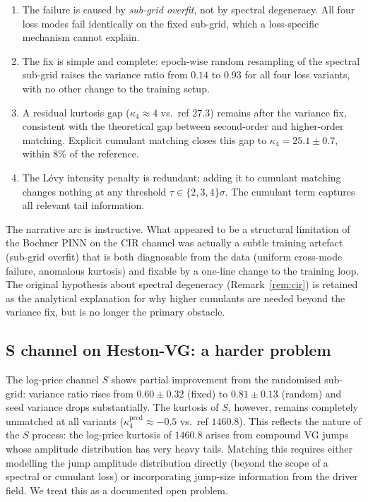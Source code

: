 \documentclass[review,12pt]{elsarticle}
\begin{document}
\begin{enumerate}
\item The failure is caused by \emph{sub-grid overfit}, not by
spectral degeneracy. All four loss modes fail identically on the
fixed sub-grid, which a loss-specific mechanism cannot explain.

\item The fix is simple and complete: epoch-wise random resampling
of the spectral sub-grid raises the variance ratio from
\(0.14\) to \(0.93\) for all four loss variants, with no other
change to the training setup.

\item A residual kurtosis gap (\(\kappa_4 \approx 4\) vs.\ ref
\(27.3\)) remains after the variance fix, consistent with the
theoretical gap between second-order and higher-order matching.
Explicit cumulant matching closes this gap to
\(\kappa_4 = 25.1 \pm 0.7\), within 8\% of the reference.

\item The L\'evy intensity penalty is redundant: adding it to
cumulant matching changes nothing at any threshold
\(\tau \in \{2, 3, 4\}\sigma\). The cumulant term captures all
relevant tail information.
\end{enumerate}

The narrative arc is instructive. What appeared to be a structural
limitation of the Bochner PINN on the CIR channel was actually a
subtle training artefact (sub-grid overfit) that is both
diagnosable from the data (uniform cross-mode failure, anomalous
kurtosis) and fixable by a one-line change to the training loop.
The original hypothesis about spectral degeneracy (Remark~\ref{rem:cir})
is retained as the analytical explanation for why higher cumulants
are needed beyond the variance fix, but is no longer the primary
obstacle.

\subsection{S channel on Heston-VG: a harder problem}

The log-price channel \(S\) shows partial improvement from the
randomised sub-grid: variance ratio rises from \(0.60 \pm 0.32\)
(fixed) to \(0.81 \pm 0.13\) (random) and seed variance drops
substantially. The kurtosis of \(S\), however, remains completely
unmatched at all variants (\(\kappa_4^{\mathrm{pred}} \approx -0.5\)
vs.\ ref \(1460.8\)). This reflects the nature of the \(S\)
process: the log-price kurtosis of \(1460.8\) arises from
compound VG jumps whose amplitude distribution has very heavy tails.
Matching this requires either modelling the jump amplitude
distribution directly (beyond the scope of a spectral or cumulant
loss) or incorporating jump-size information from the driver field.
We treat this as a documented open problem.
\end{document}
